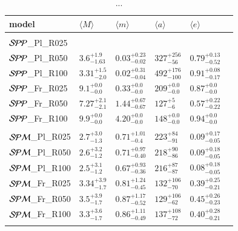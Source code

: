 \documentclass[aa]{lib/aa}
\begin{document}
\begin{table}
 \caption{...}
 \label{Tab:model_PP}
 \centering 
 \begin{tabular}{llllll}
 \hline\hline
model & $\langle M \rangle$ & $\langle m \rangle$ & $\langle a \rangle$ & $\langle e \rangle$ \\
        \hline \vspace{-0.75em}\\
${\cal SPP}$\_Pl\_R025 & \\%
${\cal SPP}$\_Pl\_R050 & $3.6^{+1.9}_{-1.63}$ & $0.03^{+0.23}_{-0.02}$ & $327^{+256}_{-56}$  & $0.79^{+0.13}_{-0.52}$ \\
${\cal SPP}$\_Pl\_R100 & $3.31^{+1.5}_{-2.0}$ & $0.02^{+0.31}_{-0.04}$ & $492^{+176}_{-100}$ & $0.91^{+0.08}_{-0.17}$ \\
${\cal SPP}$\_Fr\_R025 & $9.1^{+0.0}_{-0.0}$ & $0.33^{+0.0}_{-0.0}$   & $209^{+0.0}_{-0.0}$ & $0.87^{+0.0}_{-0.0}$ \\
${\cal SPP}$\_Fr\_R050 & $7.27^{+2.1}_{-2.1}$ & $1.44^{+0.67}_{-0.67}$ & $127^{+5}_{-6}$    & $0.57^{+0.22}_{-0.22}$ \\
${\cal SPP}$\_Fr\_R100 & $9.9^{+0.0}_{-0.0}$ & $4.20^{+0.0}_{-0.0}$    & $148^{+0.0}_{-0.0}$ & $0.94^{+0.0}_{-0.0}$ \\
  \hline \vspace{-0.75em} \\ 
${\cal SPM}$\_Pl\_R025 & $2.7^{+3.0}_{-1.3}$ & $0.71^{+1.01}_{-0.4}$ & $223^{+84}_{-91}$ & $0.09^{+0.17}_{-0.05}$ \\
${\cal SPM}$\_Pl\_R050 & $2.6^{+3.2}_{-1.2}$ & $0.71^{+0.97}_{-0.40}$ & $218^{+90}_{-86}$ & $0.09^{+0.18}_{-0.05}$ \\
${\cal SPM}$\_Pl\_R100 & $2.5^{+3.1}_{-1.2}$ & $0.67^{+0.93}_{-0.36}$ & $216^{+87}_{-87}$ & $0.08^{+0.18}_{-0.05}$ \\
${\cal SPM}$\_Fr\_R025 & $3.34^{+3.9}_{-1.7}$ & $0.81^{+1.24}_{-0.45}$ & $132^{+106}_{-70}$ & $0.39^{+0.25}_{-0.21}$ \\
${\cal SPM}$\_Fr\_R050 & $3.5^{+3.9}_{-1.7}$ & $0.87^{+1.17}_{-0.52}$ & $129^{+106}_{-62}$ & $0.45^{+0.26}_{-0.23}$ \\
  ${\cal SPM}$\_Fr\_R100 & $3.3^{+3.6}_{-1.7}$ & $0.86^{+1.11}_{-0.49}$ & $137^{+108}_{-72}$ & $0.40^{+0.28}_{-0.21}$ \\
  \hline \vspace{-0.75em} \\ 

\end{tabular}
\end{table}
\end{document}
